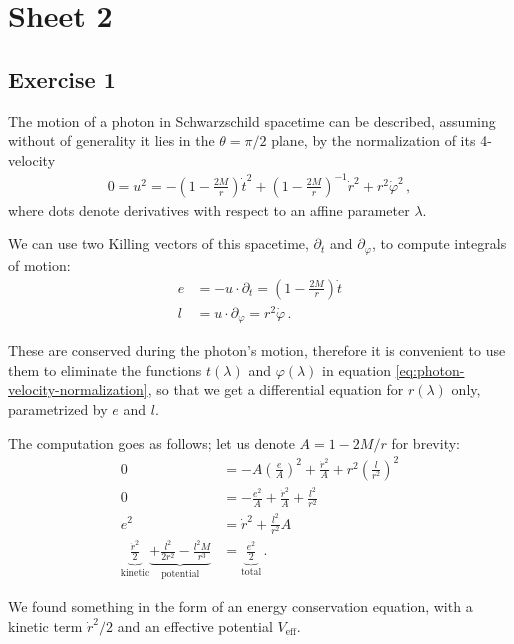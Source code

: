 \documentclass[main.tex]{subfiles}
\begin{document}
\section*{Sheet 2}

\subsection{Exercise 1}

The motion of a photon in Schwarzschild spacetime can be described, 
assuming without of generality it lies in the \(\theta = \pi / 2\) plane, 
by the normalization of its 4-velocity %
\begin{align} \label{eq:photon-velocity-normalization}
0 = u^2 = - \left(1 - \frac{2M}{r}\right) \dot{t}^2 + \left(1 - \frac{2M}{r}\right)^{-1} \dot{r}^2 + r^2 \dot{\varphi}^2
\,,
\end{align}
%
where dots denote derivatives with respect to an affine parameter \(\lambda\). 

We can use two Killing vectors of this spacetime, \(\partial_t\) and \(\partial_\varphi\), 
to compute integrals of motion: %
\begin{align}
e &= - u \cdot \partial_t = \left(1 - \frac{2M}{r}\right) \dot{t}  \\
l &= u \cdot \partial_\varphi = r^2 \dot{\varphi}
\,.
\end{align}

These are conserved during the photon's motion, therefore it is convenient to use them to 
eliminate the functions \(t(\lambda )\) and \(\varphi (\lambda )\) in equation \eqref{eq:photon-velocity-normalization}, 
so that we get a differential equation for \(r(\lambda )\) only, parametrized by \(e\) and \(l\).

The computation goes as follows; let us denote \(A =1 - 2M/r\) for brevity: 
%
\begin{align}
0 &= - A \left( \frac{e}{A}\right)^2 + \frac{\dot{r}^2}{A} + r^2 \left( \frac{l}{r^2}\right)^2   \\
0 &= - \frac{e^2}{A} + \frac{\dot{r}^2}{A} + \frac{l^2}{r^2}  \\
e^2 &= \dot{r}^2 + \frac{l^2}{r^2} A \\
\underbrace{\frac{\dot{r}^2}{2}}_{\text{kinetic}} 
\underbrace{+ \frac{l^2}{2r^2} - \frac{l^2M}{r^3}}_{\text{potential}} &= \underbrace{\frac{e^2}{2}}_{\text{total}} \label{eq:photon-trajectory-schwarzschild}
\,.
\end{align}

We found something in the form of an energy conservation equation, 
with a kinetic term \(\dot{r}^2 / 2\) and an effective potential \(V _{\text{eff}}\). 
\end{document}
